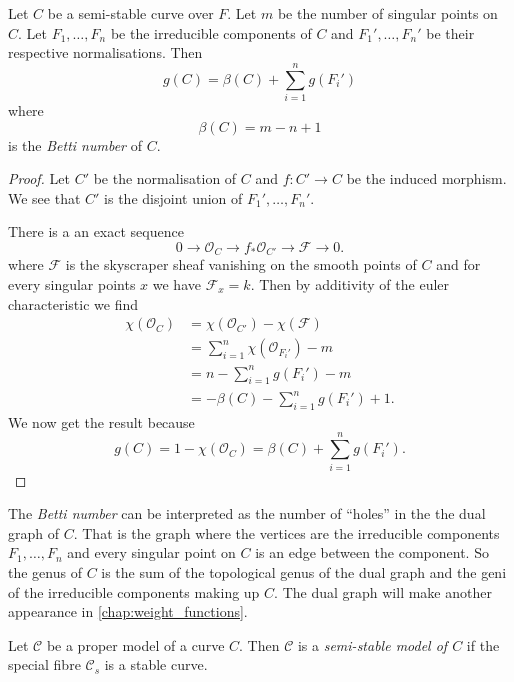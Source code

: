 \begin{lemma}\label{lem:genus_semi_stable_curve}
	Let $C$ be a semi-stable curve over $F$. 
	Let $m$ be the number of singular points on $C$. 
	Let $F_1, \ldots, F_n$ be the irreducible components of $C$ and $F_1', \ldots, F_n'$ be their respective normalisations.
	Then \[
		g(C) = \beta(C) + \sum_{i = 1}^{n} g(F_i')
	\] 
	where \[
		\beta(C) = m - n + 1
	\]
	is the \emph{Betti number} of $C$. 
\end{lemma}
\begin{proof}
	Let $C'$ be the normalisation of $C$ and $f: C' \to C$ be the induced morphism. 
	We see that  $C'$ is the disjoint union of $F_1', \ldots, F_n'$. 

	There is a an exact sequence \[
	0 \to \mathcal{O}_C \to f_* \mathcal{O}_{C'} \to \mathcal{F} \to 0 
	.\] 
	where $\mathcal{F} $ is the skyscraper sheaf vanishing on the smooth points of $C$ and for every singular points $x$ we have $\mathcal{F} _x = k$.  
	Then by additivity of the euler characteristic we find
	\begin{align*}
		\chi(\mathcal O_C) &= \chi(\mathcal O_{C'}) - \chi(\mathcal F) \\
				   &= \sum_{i = 1}^{n} \chi(\mathcal O_{F_i'}) - m\\
				   &= n -  \sum_{i = 1}^{n} g(F_i') - m\\
				   &= -\beta(C) - \sum_{i = 1}^{n} g(F_i') + 1 
	.\end{align*}
	We now get the result because \[
		g(C) = 1 - \chi(\mathcal{O}_C) = \beta(C) + \sum_{i = 1}^{n} g(F_i')  
	.\] 
\end{proof}
\begin{remark}
	The \emph{Betti number} can be interpreted as the number of ``holes'' in the the dual graph of $C$. 
	That is the graph where the vertices are the irreducible components $F_1, \ldots, F_n$ and every singular point on $C$ is an edge between the component. 
	So the genus of $C$ is the sum of the topological genus of the dual graph and the geni of the irreducible components making up $C$.
	The dual graph will make another appearance in \cref{chap:weight_functions}. 
\end{remark}

\begin{definition}\label{def:semi_stable_model}
	Let  $\mathscr C$ be a proper model of a curve $C$. 
	Then $\mathscr C$ is a \emph{semi-stable model of $C$} if the special fibre $\mathscr C_s$ is a stable curve. 
\end{definition}

